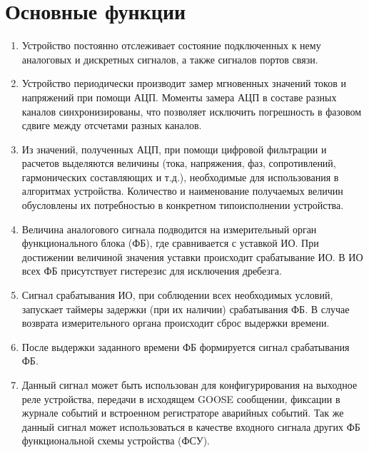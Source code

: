 \color{unidarkgreen}\section[Основные функции]{Основные функции}\label{sec:funcs}
\color{black}

\color{black}

\begin{enumerate}[label=\arabic{section}.\arabic{subsection}.\arabic*, labelsep=4pt, leftmargin=0pt, itemindent=57pt]
    
\item
Устройство постоянно отслеживает состояние подключенных к нему аналоговых и дискретных сигналов, а также сигналов портов связи.

\item
Устройство периодически производит замер мгновенных значений токов и напряжений при помощи АЦП. Моменты замера АЦП в составе разных каналов синхронизированы, что позволяет исключить погрешность в фазовом сдвиге между отсчетами разных каналов.

\item
Из значений, полученных АЦП, при помощи цифровой фильтрации и расчетов выделяются величины (тока, напряжения, фаз, сопротивлений, гармонических составляющих и т.д.), необходимые для использования в алгоритмах устройства. Количество и наименование получаемых величин обусловлены их потребностью в конкретном типоисполнении устройства.

\item
Величина аналогового сигнала подводится на измерительный орган функционального блока (ФБ), где сравнивается с уставкой ИО. При достижении величиной значения уставки происходит срабатывание ИО. В ИО всех ФБ присутствует гистерезис для исключения дребезга.

\item
Сигнал срабатывания ИО, при соблюдении всех необходимых условий, запускает таймеры задержки (при их наличии) срабатывания ФБ. В случае возврата измерительного органа происходит сброс выдержки времени.

\item
После выдержки заданного времени ФБ формируется сигнал срабатывания ФБ.

\item
Данный сигнал может быть использован для конфигурирования на выходное реле устройства, передачи в исходящем GOOSE сообщении, фиксации в журнале событий и встроенном регистраторе аварийных событий. Так же данный сигнал может использоваться в качестве входного сигнала других ФБ функциональной схемы устройства (ФСУ).


\end{enumerate}
